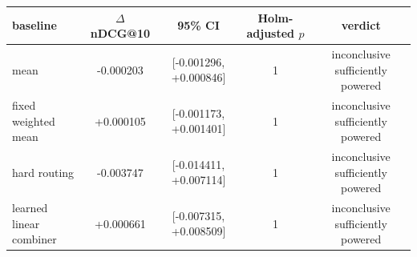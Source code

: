 \begin{tabular}{lcccc}
\toprule
baseline & $\Delta$ nDCG@10 & 95\% CI & Holm-adjusted $p$ & verdict \\ 
\midrule
mean & -0.000203 & [-0.001296, +0.000846] & 1 & inconclusive sufficiently powered \\
fixed weighted mean & +0.000105 & [-0.001173, +0.001401] & 1 & inconclusive sufficiently powered \\
hard routing & -0.003747 & [-0.014411, +0.007114] & 1 & inconclusive sufficiently powered \\
learned linear combiner & +0.000661 & [-0.007315, +0.008509] & 1 & inconclusive sufficiently powered \\
\bottomrule
\end{tabular}
